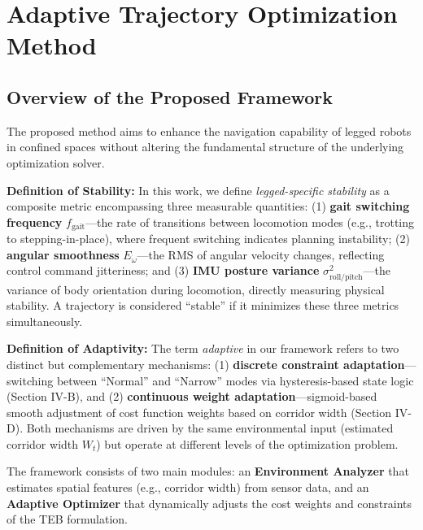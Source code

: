 \documentclass[lettersize,journal]{IEEEtran}
\begin{document}
\section{Adaptive Trajectory Optimization Method}

\subsection{Overview of the Proposed Framework}
The proposed method aims to enhance the navigation capability of legged robots in confined spaces without altering the fundamental structure of the underlying optimization solver. 

\textbf{Definition of Stability:} In this work, we define \textit{legged-specific stability} as a composite metric encompassing three measurable quantities: (1) \textbf{gait switching frequency} $f_{\text{gait}}$---the rate of transitions between locomotion modes (e.g., trotting to stepping-in-place), where frequent switching indicates planning instability; (2) \textbf{angular smoothness} $E_{\dot{\omega}}$---the RMS of angular velocity changes, reflecting control command jitteriness; and (3) \textbf{IMU posture variance} $\sigma^2_{\text{roll/pitch}}$---the variance of body orientation during locomotion, directly measuring physical stability. A trajectory is considered ``stable'' if it minimizes these three metrics simultaneously.

\textbf{Definition of Adaptivity:} The term \textit{adaptive} in our framework refers to two distinct but complementary mechanisms: (1) \textbf{discrete constraint adaptation}---switching between ``Normal'' and ``Narrow'' modes via hysteresis-based state logic (Section IV-B), and (2) \textbf{continuous weight adaptation}---sigmoid-based smooth adjustment of cost function weights based on corridor width (Section IV-D). Both mechanisms are driven by the same environmental input (estimated corridor width $W_t$) but operate at different levels of the optimization problem.

The framework consists of two main modules: an \textbf{Environment Analyzer} that estimates spatial features (e.g., corridor width) from sensor data, and an \textbf{Adaptive Optimizer} that dynamically adjusts the cost weights and constraints of the TEB formulation.
\end{document}
